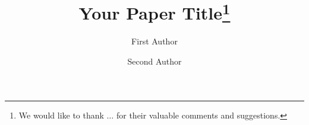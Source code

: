 
\title{Your Paper Title\thanks{We would like to thank $\ldots$ for their valuable comments and suggestions.}}

\author[1]{First Author}
\author[2]{Second Author}

\maketitle
